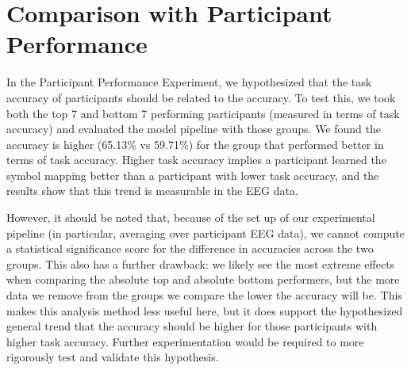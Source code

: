 \section{Comparison with Participant Performance}
In the Participant Performance Experiment, we hypothesized that the task 
accuracy of participants should be related to the \tvt accuracy. To test this, 
we took both the top 7 and bottom 7 performing participants (measured in terms 
of task accuracy) and evaluated the model pipeline with those groups. We found 
the \tvt accuracy is higher (65.13\% vs 59.71\%) for the group that performed 
better in terms of task accuracy. Higher task accuracy implies a participant 
learned the symbol mapping better than a participant with lower task accuracy, 
and the \tvt results show that this trend is measurable in the EEG data.  

However, it should be noted that, because of the set up of our experimental 
pipeline (in particular, averaging over participant EEG data), we cannot 
compute a statistical significance score for the difference in \tvt accuracies 
across the two groups. This also has a further drawback: we likely see the most 
extreme effects when comparing the absolute top and absolute bottom performers, 
but the more data we remove from the groups we compare the lower the \tvt 
accuracy will be. This makes this analysis method less useful here, but it does 
support the hypothesized general trend that the \tvt accuracy should be higher 
for those participants with higher task accuracy. Further experimentation would 
be required to more rigorously test and validate this hypothesis.

